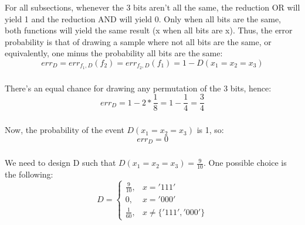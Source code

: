 For all subsections, whenever the 3 bits aren't all the same, the reduction OR will yield 1 and the reduction AND will yield 0. 
Only when all bits are the same, both functions will yield the same result (x when all bits are x).
Thus, the error probability is that of drawing a sample where not all bits are the same, or equivalently, one minus the probability all bits are the same:
\begin{equation*}
    err_D = err_{f_1, D}(f_2) = err_{f_2, D}(f_1) = 1 - D(x_1=x_2=x_3)
\end{equation*}

\subsubsection{}
There's an equal chance for drawing any permutation of the 3 bits, hence:
\begin{equation*}
    err_D = 1 - 2*\frac{1}{8} = 1 - \frac{1}{4} = \frac{3}{4}
\end{equation*}

\subsubsection{}
Now, the probability of the event $D(x_1=x_2=x_3)$ is 1, so:
\begin{equation*}
    err_D = 0
\end{equation*}

\subsubsection{}
We need to design D such that $D(x_1=x_2=x_3) = \frac{9}{10}$. One possible choice is the following:
\begin{equation*}
    D = 
    \begin{cases}
        \frac{9}{10}, & x = '111' \\
        0, & x = '000' \\
        \frac{1}{60}, & x \neq \{'111', '000'\}
    \end{cases}
\end{equation*}